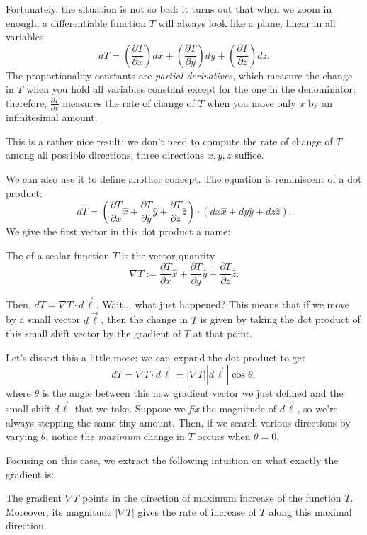 Fortunately, the situation is not so bad: it turns out that when we zoom in enough, a differentiable function $T$ will always look like a plane, linear in all variables:
\[dT=\left(\frac{\partial T}{\partial x}\right)dx+\left(\frac{\partial T}{\partial y}\right)dy+\left(\frac{\partial T}{\partial z}\right)dz.\]
The proportionality constants are \textit{partial derivatives}, which measure the change in $T$ when you hold all variables constant except for the one in the denominator: therefore, $\frac{\partial T}{\partial x}$ measures the rate of change of $T$ when you move only $x$ by an infinitesimal amount.

This is a rather nice result: we don't need to compute the rate of change of $T$ among all possible directions; three directions $x,y,z$ suffice. 

We can also use it to define another concept. The equation is reminiscent of a dot product:
\[dT=\left(\frac{\partial T}{\partial x}\hat{x}+\frac{\partial T}{\partial y}\hat{y}+\frac{\partial T}{\partial z}\hat{z}\right)\cdot(dx \hat{x}+dy\hat{y}+dz \hat{z}).\]
We give the first vector in this dot product a name:
\begin{definition}
The  of a scalar function $T$ is the vector quantity
\[\nabla T:=\frac{\partial T}{\partial x}\hat{x}+\frac{\partial T}{\partial y}\hat{y}+\frac{\partial T}{\partial z}\hat{z}.\]
\end{definition}

Then, $dT=\nabla T\cdot d\vec{\ell}$. Wait... what just happened? This means that if we move by a small vector $d\vec{\ell}$, then the change in $T$ is given by taking the dot product of this small shift vector by the gradient of $T$ at that point. 

Let's dissect this a little more: we can expand the dot product to get
\[dT=\nabla T\cdot d\vec{\ell}=|\nabla T||d\vec{\ell}|\cos\theta,\]
where $\theta$ is the angle between this new gradient vector we just defined and the small shift $d\vec{\ell}$ that we take. Suppose we \textit{fix} the magnitude of $d\vec{\ell}$, so we're always stepping the same tiny amount. Then, if we search various directions by varying $\theta$, notice the \textit{maximum} change in $T$ occurs when $\theta=0$. 

Focusing on this case, we extract the following intuition on what exactly the gradient is:

\begin{moral}
The gradient $\nabla T$ points in the direction of maximum increase of the function $T$. Moreover, its magnitude $|\nabla T|$ gives the rate of increase of $T$ along this maximal direction.
\end{moral}

